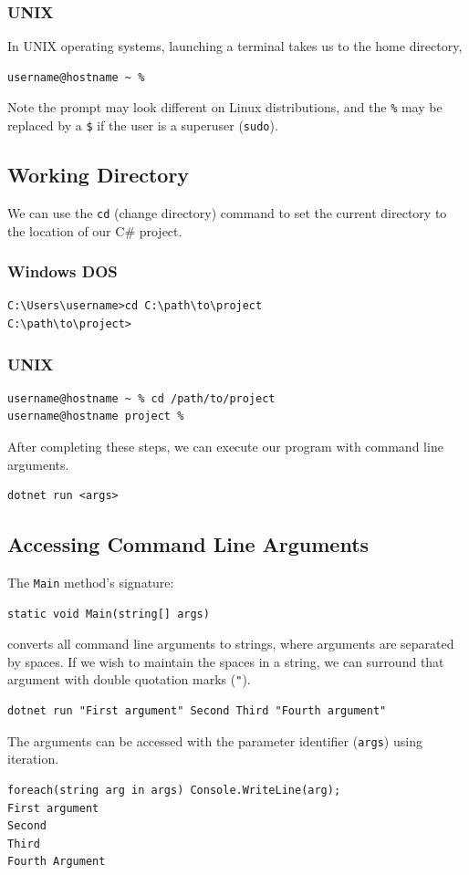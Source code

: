 \documentclass{article}
\def\customlinemarker#1#2{
    \edef\thelstnumber{%
        \unexpanded{%
            \ifnum#1=\value{lstnumber}\relax
              #2%
            \fi}%
        \ifx\thelstnumber\relax\else
        \expandafter\unexpanded\expandafter{\thelstnumber}%
        \fi
    }
}
\begin{document}
\subsubsection{UNIX}
In UNIX operating systems, launching a terminal takes us to the home directory,
\begin{lstlisting}[language=bash,numbers=none]
username@hostname ~ % 
\end{lstlisting}
Note the prompt may look different on Linux distributions, and the \lstinline{%} may be replaced by a \lstinline{$} if
the user is a superuser (\lstinline{sudo}).
\subsection{Working Directory}
We can use the \lstinline{cd} (change directory) command to
set the current directory to the location of our C\# project.
\subsubsection{Windows DOS}
\begin{lstlisting}[numbers=none]
C:\Users\username>cd C:\path\to\project
C:\path\to\project>
\end{lstlisting}
\subsubsection{UNIX}
\begin{lstlisting}[numbers=none]
username@hostname ~ % cd /path/to/project
username@hostname project %
\end{lstlisting}
After completing these steps, we can execute our program with command line arguments.
\begingroup
\let\thelstnumber\relax
\customlinemarker{1}{\$}
\begin{lstlisting}
dotnet run <args>
\end{lstlisting}
\endgroup
\subsection{Accessing Command Line Arguments}
The \lstinline{Main} method's signature:
\begin{lstlisting}[numbers=none]
static void Main(string[] args)
\end{lstlisting}
converts all command line arguments to strings,
where arguments are separated by spaces. If we wish to maintain the spaces
in a string, we can surround that argument with double quotation marks (\lstinline{"}). %
\begingroup
\let\thelstnumber\relax
\customlinemarker{1}{\$}
\begin{lstlisting}
dotnet run "First argument" Second Third "Fourth argument" 
\end{lstlisting}
\endgroup
The arguments can be accessed with the parameter identifier (\lstinline{args})
using iteration.
\begingroup
\let\thelstnumber\relax
\customlinemarker{1}{\$}
\begin{lstlisting}
foreach(string arg in args) Console.WriteLine(arg);
First argument
Second
Third
Fourth Argument
\end{lstlisting}
\endgroup
\end{document}
